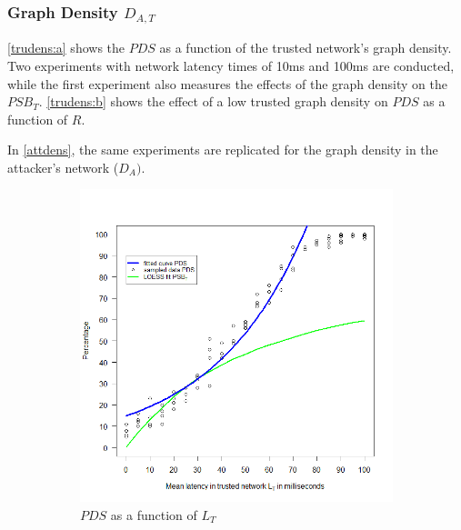 \documentclass[a4paper,12pt,twoside]{report}
\begin{document}
\subsubsection{Graph Density $D_{A,T}$}
\autoref{trudens:a} shows the $PDS$ as a function of the trusted network's graph density. Two experiments with network latency times of 10ms and 100ms are conducted, while the first experiment also measures the effects of the graph density on the $PSB_T$. \autoref{trudens:b} shows the effect of a low trusted graph density on $PDS$ as a function of $R$.

In \autoref{attdens}, the same experiments are replicated for the graph density in the attacker's network ($D_{A})$.
\begin{figure}[hb]
\centering
\begin{subfigure}{.5\textwidth}
  \centering
  \includegraphics[width=\linewidth]{Experiments/TruLatency/trulat.png}
  \caption{$PDS$ as a function of $L_{T}$}
  \label{trulat:a}
\end{subfigure}%
\begin{subfigure}{.5\textwidth}
  \centering

\end{subfigure}
\end{figure}
\end{document}
